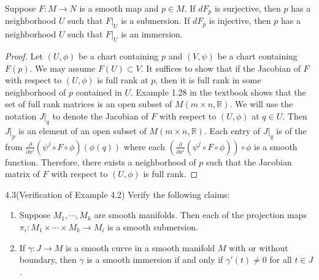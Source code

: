 \begin{customthm}{4.1}
  Suppose $F: M \rightarrow N$ is a smooth map and $p \in M$.
  If $dF_p$ is surjective, then $p$ has a neighborhood $U$ such that $F\vert_U$ is a submersion.
  If $dF_p$ is injective, then $p$ has a neighborhood $U$ such that $F\vert_U$ is an immersion.
\end{customthm}

\begin{proof}
  Let $(U, \phi)$ be a chart containing $p$ and $(V, \psi)$ be a chart containing $F(p)$.
  We may assume $F(U) \subset V$.
  It suffices to show that if the Jacobian of $F$ with respect to $(U, \phi)$ is full rank at $p$, then it is full rank in some neighborhood of $p$ contained in $U$.
  Example 1.28 in the textbook shows that the set of full rank matrices is an open subset of $M(m \times n, \mathbb{R})$.
  We will use the notation $J\vert_{q}$ to denote the Jacobian of $F$ with respect to $(U, \phi)$ at $q \in U$.
  Then $J\vert_{p}$ is an element of an open subset of $M(m \times n, \mathbb{R})$.
  Each entry of $J\vert_{q}$ is of the from $\frac{\partial}{\partial x^i}(\psi^j \circ F \circ \phi)(\phi(q))$ where each $(\frac{\partial}{\partial x^i}(\psi^j \circ F \circ \phi)) \circ \phi$ is a smooth function.
  Therefore, there exists a neighborhood of $p$ such that the Jacobian matrix of $F$ with respect to $(U, \phi)$ is full rank.
\end{proof}

\begin{customexer}{4.3(Verification of Example 4.2)}
  Verify the following claims:
  \begin{enumerate}[label=(\alph*)]
    \item
      Suppose $M_1, \cdots, M_k$ are smooth manifolds.
      Then each of the projection maps $\pi_i: M_1 \times \cdots \times M_k \rightarrow M_i$ is a smooth submersion.
    \item
      If $\gamma: J \rightarrow M$ is a smooth curve in a smooth manifold $M$ with or without boundary, then $\gamma$ is a smooth immersion if and only if $\gamma'(t) \ne 0$ for all $t \in J$.
  \end{enumerate}
\end{customexer}

